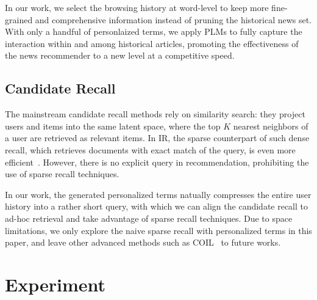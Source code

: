 \documentclass[sigconf,anonymous]{acmart}
\begin{document}
In our work, we select the browsing history at word-level to keep more fine-grained and comprehensive information instead of pruning the historical news set. With only a handful of personlaized terms, we apply PLMs to fully capture the interaction within and among historical articles, promoting the effectiveness of the news recommender to a new level at a competitive speed.

\subsection{Candidate Recall}
The mainstream candidate recall methods rely on similarity search: they project users and items into the same latent space, where the top $K$ nearest neighbors of a user are retrieved as relevant items. In IR, the sparse counterpart of such dense recall, which retrieves documents with exact match of the query, is even more efficient~\cite{sparse_and_dense_recall}. However, there is no explicit query in recommendation, prohibiting the use of sparse recall techniques.

In our work, the generated personalized terms natually compresses the entire user history into a rather short query, with which we can align the candidate recall to ad-hoc retrieval and take advantage of sparse recall techniques. Due to space limitations, we only explore the naive sparse recall with personalized terms in this paper, and leave other advanced methods such as COIL~\cite{COIL} to future works.





\section{Experiment}
\end{document}

